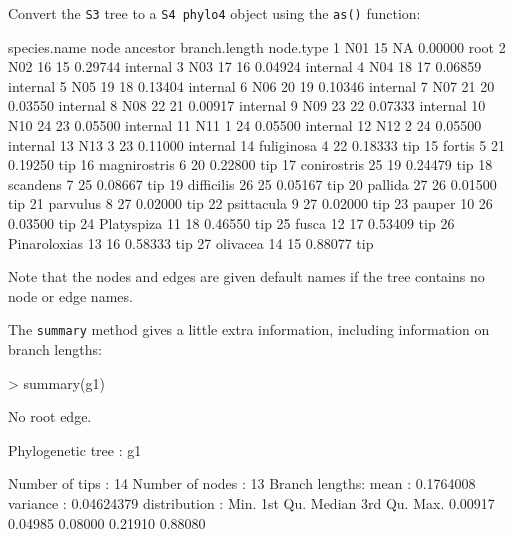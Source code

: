 \documentclass{article}
\newcommand{\code}[1]{{{\tt #1}}}
\begin{document}
Convert the \code{S3} tree to a \code{S4 phylo4} object using the \code{as()} function:
\begin{Schunk}
\begin{Soutput}
   species.name node ancestor branch.length node.type
1           N01   15       NA       0.00000      root
2           N02   16       15       0.29744  internal
3           N03   17       16       0.04924  internal
4           N04   18       17       0.06859  internal
5           N05   19       18       0.13404  internal
6           N06   20       19       0.10346  internal
7           N07   21       20       0.03550  internal
8           N08   22       21       0.00917  internal
9           N09   23       22       0.07333  internal
10          N10   24       23       0.05500  internal
11          N11    1       24       0.05500  internal
12          N12    2       24       0.05500  internal
13          N13    3       23       0.11000  internal
14   fuliginosa    4       22       0.18333       tip
15       fortis    5       21       0.19250       tip
16 magnirostris    6       20       0.22800       tip
17  conirostris   25       19       0.24479       tip
18     scandens    7       25       0.08667       tip
19   difficilis   26       25       0.05167       tip
20      pallida   27       26       0.01500       tip
21     parvulus    8       27       0.02000       tip
22   psittacula    9       27       0.02000       tip
23       pauper   10       26       0.03500       tip
24   Platyspiza   11       18       0.46550       tip
25        fusca   12       17       0.53409       tip
26 Pinaroloxias   13       16       0.58333       tip
27     olivacea   14       15       0.88077       tip
\end{Soutput}
\end{Schunk}

Note that the nodes and edges are given default names if the tree contains no node or edge names.

The \code{summary} method gives a little extra information, including information on branch lengths:
\begin{Schunk}
\begin{Sinput}
> summary(g1)
\end{Sinput}
\begin{Soutput}
  No root edge.

 Phylogenetic tree : g1 

 Number of tips    : 14 
 Number of nodes   : 13 
 Branch lengths:
        mean         : 0.1764008 
        variance     : 0.04624379 
        distribution :
   Min. 1st Qu.  Median 3rd Qu.    Max. 
0.00917 0.04985 0.08000 0.21910 0.88080 
\end{Soutput}
\end{Schunk}
\end{document}
